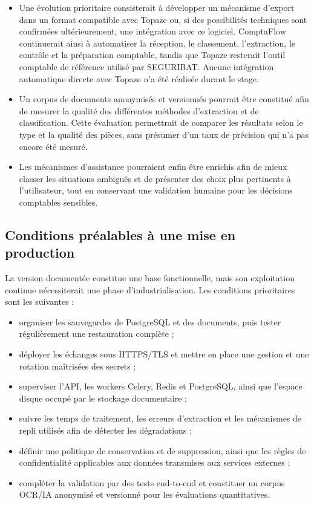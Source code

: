 \documentclass[12pt,a4paper,oneside]{report}
\begin{document}
\begin{itemize}[leftmargin=*]
  \item Une évolution prioritaire consisterait à développer un mécanisme
  d'export dans un format compatible avec Topaze ou, si des possibilités
  techniques sont confirmées ultérieurement, une intégration avec ce logiciel.
  ComptaFlow continuerait ainsi à automatiser la réception, le classement,
  l'extraction, le contrôle et la préparation comptable, tandis que Topaze
  resterait l'outil comptable de référence utilisé par SEGURIBAT. Aucune
  intégration automatique directe avec Topaze n'a été réalisée durant le stage.

  \item Un corpus de documents anonymisés et versionnés pourrait être constitué
  afin de mesurer la qualité des différentes méthodes d'extraction et de
  classification. Cette évaluation permettrait de comparer les résultats selon
  le type et la qualité des pièces, sans présumer d'un taux de précision qui n'a
  pas encore été mesuré.

  \item Les mécanismes d'assistance pourraient enfin être enrichis afin de mieux
  classer les situations ambiguës et de présenter des choix plus pertinents à
  l'utilisateur, tout en conservant une validation humaine pour les décisions
  comptables sensibles.
\end{itemize}

\subsection{Conditions préalables à une mise en production}

La version documentée constitue une base fonctionnelle, mais son exploitation
continue nécessiterait une phase d'industrialisation. Les conditions
prioritaires sont les suivantes :

\begin{itemize}[leftmargin=*]
  \item organiser les sauvegardes de PostgreSQL et des documents, puis tester
  régulièrement une restauration complète ;
  \item déployer les échanges sous HTTPS/TLS et mettre en place une gestion et
  une rotation maîtrisées des secrets ;
  \item superviser l'API, les workers Celery, Redis et PostgreSQL, ainsi que
  l'espace disque occupé par le stockage documentaire ;
  \item suivre les temps de traitement, les erreurs d'extraction et les
  mécanismes de repli utilisés afin de détecter les dégradations ;
  \item définir une politique de conservation et de suppression, ainsi que les
  règles de confidentialité applicables aux données transmises aux services
  externes ;
  \item compléter la validation par des tests end-to-end et constituer un corpus
  OCR/IA anonymisé et versionné pour les évaluations quantitatives.
\end{itemize}
\end{document}

